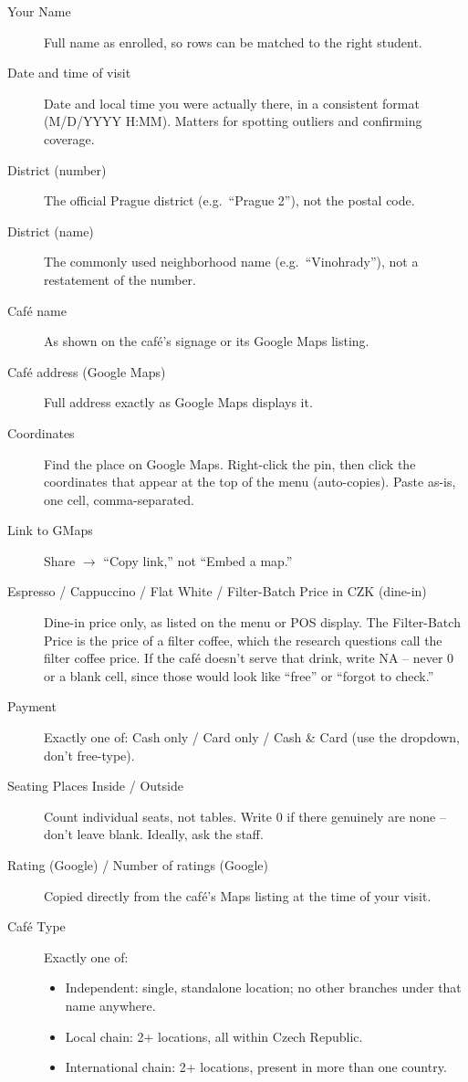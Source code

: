 \documentclass[11pt,a4paper]{article}
\begin{document}
\begin{description}
\item[Your Name] Full name as enrolled, so rows can be matched to the right student.
\item[Date and time of visit] Date and local time you were actually there, in a consistent format (M/D/YYYY H:MM). Matters for spotting outliers and confirming coverage.
\item[District (number)] The official Prague district (e.g.\ ``Prague 2''), not the postal code.
\item[District (name)] The commonly used neighborhood name (e.g.\ ``Vinohrady''), not a restatement of the number.
\item[Caf\'e name] As shown on the caf\'e's signage or its Google Maps listing.
\item[Caf\'e address (Google Maps)] Full address exactly as Google Maps displays it.
\item[Coordinates] Find the place on Google Maps. Right-click the pin, then click the coordinates that appear at the top of the menu (auto-copies). Paste as-is, one cell, comma-separated.
\item[Link to GMaps] Share $\rightarrow$ ``Copy link,'' not ``Embed a map.''
\item[Espresso / Cappuccino / Flat White / Filter-Batch Price in CZK (dine-in)] Dine-in price only, as listed on the menu or POS display. The Filter-Batch Price is the price of a filter coffee, which the research questions call the filter coffee price. If the caf\'e doesn't serve that drink, write NA -- never 0 or a blank cell, since those would look like ``free'' or ``forgot to check.''
\item[Payment] Exactly one of: Cash only / Card only / Cash \& Card (use the dropdown, don't free-type).
\item[Seating Places Inside / Outside] Count individual seats, not tables. Write 0 if there genuinely are none -- don't leave blank. Ideally, ask the staff.
\item[Rating (Google) / Number of ratings (Google)] Copied directly from the caf\'e's Maps listing at the time of your visit.
\item[Caf\'e Type] Exactly one of:
  \begin{itemize}
  \item Independent: single, standalone location; no other branches under that name anywhere.
  \item Local chain: 2+ locations, all within Czech Republic.
  \item International chain: 2+ locations, present in more than one country.

\end{itemize}
\end{description}
\end{document}
